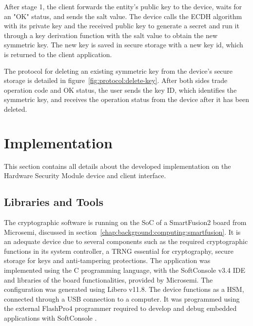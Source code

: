 After stage 1, the client forwards the entity's public key to the device, waits for an "OK" status, and sends the salt value. The device calls the ECDH algorithm with its private key and the received public key to generate a secret and run it through a key derivation function with the salt value to obtain the new symmetric key.
The new key is saved in secure storage with a new key id, which is returned to the client application.

The protocol for deleting an existing symmetric key from the device's secure storage is detailed in figure~\ref{fig:protocol:delete-key}.
After both sides trade operation code and OK status, the user sends the key ID, which identifies the symmetric key, and receives the operation status from the device after it has been deleted.

\section{Implementation}\label{chap:implementation:app}

This section contains all details about the developed implementation on the Hardware Security Module device and client interface.

\subsection{Libraries and Tools}\label{chap:implementation:app:tools}

The cryptographic software is running on the \ac{SoC} of a SmartFusion2 board from Microsemi, discussed in section~\ref{chap:background:computing:smartfusion}. It is an adequate device due to several components such as the required cryptographic functions in its system controller, a \ac{TRNG} essential for cryptography, secure storage for keys and anti-tampering protections.
The application was implemented using the C programming language, with the SoftConsole v3.4 \ac{IDE} and libraries of the board functionalities, provided by Microsemi. The configuration was generated using Libero v11.8.
The device functions as a \ac{HSM}, connected through a \ac{USB} connection to a computer. It was programmed using the external FlashPro4 programmer required to develop and debug embedded applications with SoftConsole \cite{smartfusionSecurityPractices}.

